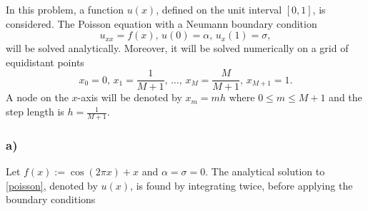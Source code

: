 In this problem, a function $u(x)$, defined on the unit interval $[0,1]$, is considered. The Poisson equation with a Neumann boundary condition
\begin{equation}\label{poisson}
    u_{xx} = f(x), \, u(0) = \alpha, \, u_x(1) = \sigma,
\end{equation}
will be solved analytically. Moreover, it will be solved numerically on a grid of equidistant points
\begin{equation*}
    x_0 = 0, \, x_1 = \frac{1}{M+1}, \, \dots, \, x_M = \frac{M}{M+1}, \, x_{M+1} = 1. 
\end{equation*}
A node on the $x$-axis will be denoted by $x_m=mh$ where $0 \leq m \leq M+1$ and the step length is $h = \frac{1}{M+1}$.

\subsubsection{a)}

Let $f(x) := \cos{(2\pi x)} + x$ and $\alpha = \sigma = 0$. The analytical solution to \eqref{poisson}, denoted by $u(x)$, is found by integrating twice, before applying the boundary conditions

